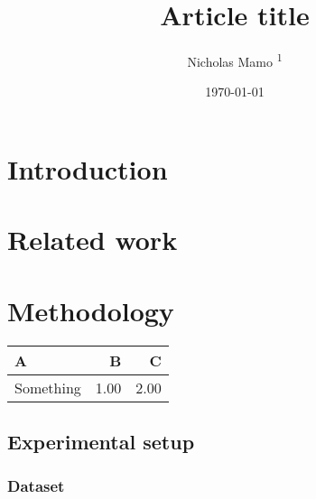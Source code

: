 \documentclass[twocolumn]{elegantarticle}
\title{Article title}
\author{Nicholas Mamo \textsuperscript{1}}
\affiliation{\textsuperscript{1} Independent}
\date{\today}
\begin{document}
	\maketitle
	
	\section{Introduction}
	
		\lipsum[1-3]
	
	\section{Related work}
	
		\lipsum[4-8]
		
	\section{Methodology}
	
		\lipsum[9]
		
		\begin{table}[t!]
			\begin{tabularx}{\linewidth}{ X r r }
				\textbf{A} & \textbf{B} & \textbf{C} \\ \hline
				Something & 1.00 & 2.00 \\
			\end{tabularx}
		\end{table}
		
		\subsection{Experimental setup}
		
			\lipsum[10]
			
			\subsubsection{Dataset}
			
				\lipsum[11]
\end{document}
